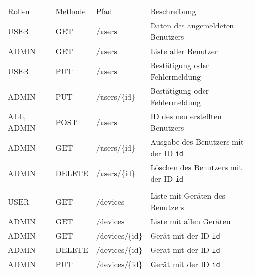 \begin{minipage}[t]{\textwidth}
	\centering
	\begin{tabu}{>{\ttfamily}X[2]X[1]>{\ttfamily}X[3]>{\small}X[4]}
		\rowfont[l]{\normalfont\bfseries\normalsize}
		Rollen & Methode & Pfad &   Beschreibung\\
		USER & GET & /users &   Daten des angemeldeten Benutzers\\ 
		ADMIN & GET & /users &  Liste aller Benutzer\\
		USER & PUT & /users & Bestätigung oder Fehlermeldung\\
		ADMIN & PUT & /users/\{id\} & Bestätigung oder Fehlermeldung\\ 
		ALL, ADMIN & POST & /users &  ID des neu erstellten Benutzers\\
		ADMIN & GET & /users/\{id\} & Ausgabe des Benutzers mit der ID \texttt{id}\\
		ADMIN & DELETE & /users/\{id\} & Löschen des Benutzers mit der ID \texttt{id}\\
		\\
		USER & GET & /devices & Liste mit Geräten des Benutzers\\
		ADMIN & GET & /devices & Liste mit allen Geräten\\
		ADMIN & GET & /devices/\{id\} & Gerät mit der ID \texttt{id}\\
		
		ADMIN & DELETE & /devices/\{id\} & Gerät mit der ID \texttt{id}\\
		ADMIN & PUT & /devices/\{id\} & Gerät mit der ID \texttt{id}\\
	\end{tabu}
	\label{tbl:rest_ressourcen}
\end{minipage}



